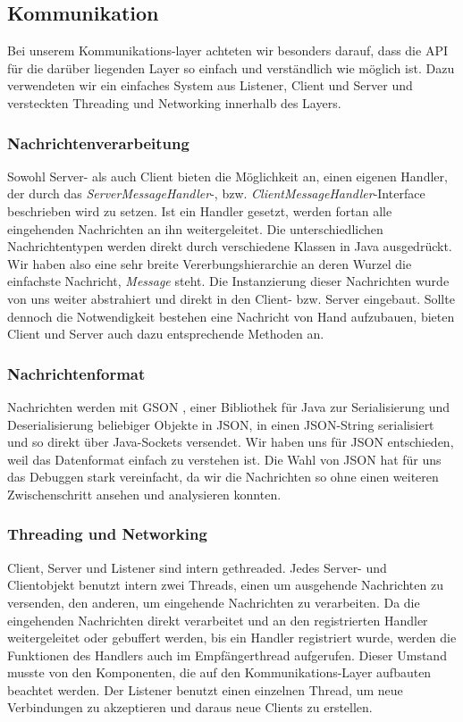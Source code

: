 \subsection{Kommunikation}
Bei unserem Kommunikations-layer achteten wir besonders darauf, dass die API für die darüber liegenden Layer so einfach und verständlich wie möglich ist. Dazu verwendeten wir ein einfaches System aus Listener, Client und Server und versteckten Threading und Networking innerhalb des Layers. 

\subsubsection{Nachrichtenverarbeitung}

Sowohl Server- als auch Client bieten die Möglichkeit an, einen eigenen Handler, der durch das \textit{ServerMessageHandler}-, bzw. \textit{ClientMessageHandler}-Interface beschrieben wird zu setzen. Ist ein Handler gesetzt, werden fortan alle eingehenden Nachrichten an ihn weitergeleitet. Die unterschiedlichen Nachrichtentypen werden direkt durch verschiedene Klassen in Java ausgedrückt. Wir haben also eine sehr breite Vererbungshierarchie an deren Wurzel die einfachste Nachricht, \textit{Message} steht. Die Instanzierung dieser Nachrichten wurde von uns weiter abstrahiert und direkt in den Client- bzw. Server eingebaut. Sollte dennoch die Notwendigkeit bestehen eine Nachricht von Hand aufzubauen, bieten Client und Server auch dazu entsprechende Methoden an. 

\subsubsection{Nachrichtenformat}

Nachrichten werden mit GSON \cite{gson}, einer Bibliothek für Java zur Serialisierung und Deserialisierung beliebiger Objekte in JSON, in einen JSON-String serialisiert und so direkt über Java-Sockets versendet. Wir haben uns für JSON entschieden, weil das Datenformat einfach zu verstehen ist. Die Wahl von JSON hat für uns das Debuggen stark vereinfacht, da wir die Nachrichten so ohne einen weiteren Zwischenschritt ansehen und analysieren konnten.

\subsubsection{Threading und Networking}

Client, Server und Listener sind intern gethreaded. Jedes Server- und Clientobjekt benutzt intern zwei Threads, einen um ausgehende Nachrichten zu versenden, den anderen, um eingehende Nachrichten zu verarbeiten. Da die eingehenden Nachrichten direkt verarbeitet und an den registrierten Handler weitergeleitet oder gebuffert werden, bis ein Handler registriert wurde, werden die Funktionen des Handlers auch im Empfängerthread aufgerufen. Dieser Umstand musste von den Komponenten, die auf den Kommunikations-Layer aufbauten beachtet werden. Der Listener benutzt einen einzelnen Thread, um neue Verbindungen zu akzeptieren und daraus neue Clients zu erstellen.

